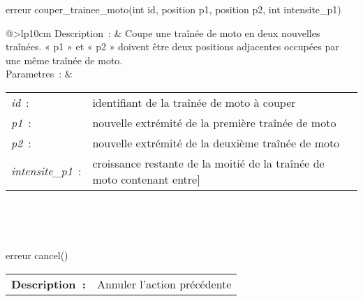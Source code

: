 \begin{minipage}{\linewidth}

\begin{lst-c++}
erreur couper_trainee_moto(int id, position p1, position p2, int intensite_p1)
\end{lst-c++}

\noindent
\begin{tabular}[t]{@{\extracolsep{0pt}}>{\bfseries}lp{10cm}}
Description~: & Coupe une traînée de moto en deux nouvelles traînées. « p1 » et « p2 » doivent être deux positions adjacentes occupées par une même traînée de moto. \\


Parametres~: &
\begin{tabular}[t]{@{\extracolsep{0pt}}ll}
    
    
      
        \textsl{id}~: & identifiant de la traînée de moto à couper \\
      
    
      
        \textsl{p1}~: & nouvelle extrémité de la première traînée de moto \\
      
    
      
        \textsl{p2}~: & nouvelle extrémité de la deuxième traînée de moto \\
      
    
      
        \textsl{intensite\_p1}~: & croissance restante de la moitié de la traînée de moto contenant entre] \\
      
    
  \end{tabular} \\






\end{tabular} \\[0.3cm]
\end{minipage}


\begin{minipage}{\linewidth}

\begin{lst-c++}
erreur cancel()
\end{lst-c++}

\noindent
\begin{tabular}[t]{@{\extracolsep{0pt}}>{\bfseries}lp{10cm}}
Description~: & Annuler l'action précédente \\







\end{tabular} \\[0.3cm]
\end{minipage}



